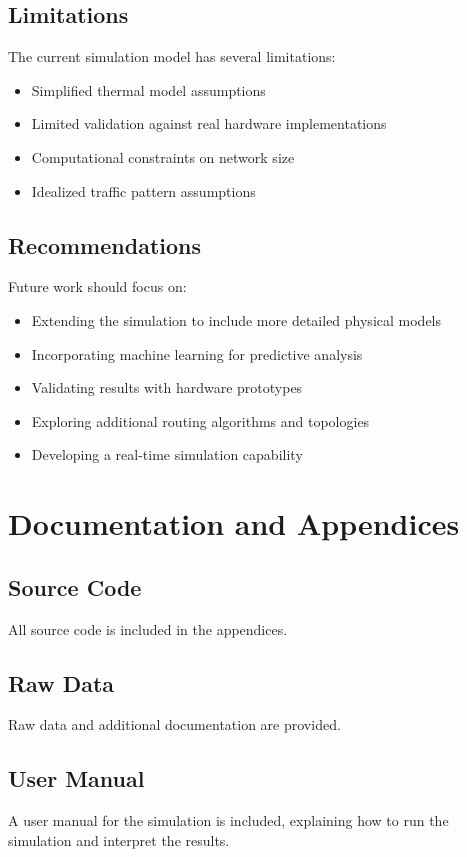 \documentclass[12pt]{article}
\begin{document}
\subsection{Limitations}
The current simulation model has several limitations:
\begin{itemize}
    \item Simplified thermal model assumptions
    \item Limited validation against real hardware implementations
    \item Computational constraints on network size
    \item Idealized traffic pattern assumptions
\end{itemize}

\subsection{Recommendations}
Future work should focus on:
\begin{itemize}
    \item Extending the simulation to include more detailed physical models
    \item Incorporating machine learning for predictive analysis
    \item Validating results with hardware prototypes
    \item Exploring additional routing algorithms and topologies
    \item Developing a real-time simulation capability
\end{itemize}

\section{Documentation and Appendices}
\subsection{Source Code}
All source code is included in the appendices.

\subsection{Raw Data}
Raw data and additional documentation are provided.

\subsection{User Manual}
A user manual for the simulation is included, explaining how to run the simulation and interpret the results.
\end{document}
